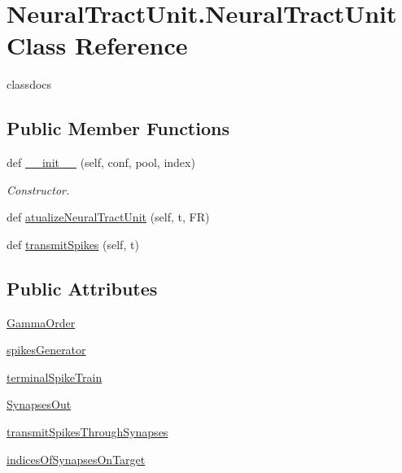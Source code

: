 \hypertarget{class_neural_tract_unit_1_1_neural_tract_unit}{}\section{Neural\+Tract\+Unit.\+Neural\+Tract\+Unit Class Reference}
\label{class_neural_tract_unit_1_1_neural_tract_unit}


classdocs  


\subsection*{Public Member Functions}
\begin{DoxyCompactItemize}
\item 
def \hyperlink{class_neural_tract_unit_1_1_neural_tract_unit_acd96f13aa788dc9699fed515783b6543}{\+\_\+\+\_\+init\+\_\+\+\_\+} (self, conf, pool, index)
\begin{DoxyCompactList}\small\item\em Constructor. \end{DoxyCompactList}\item 
def \hyperlink{class_neural_tract_unit_1_1_neural_tract_unit_a30ea40e013697346cae35a342640a6e4}{atualize\+Neural\+Tract\+Unit} (self, t, FR)
\item 
def \hyperlink{class_neural_tract_unit_1_1_neural_tract_unit_a6244f11e9aae2d31066e020f9421a9d8}{transmit\+Spikes} (self, t)
\end{DoxyCompactItemize}
\subsection*{Public Attributes}
\begin{DoxyCompactItemize}
\item 
\hyperlink{class_neural_tract_unit_1_1_neural_tract_unit_aee01a134ce97127783d75757ec15f352}{Gamma\+Order}
\item 
\hyperlink{class_neural_tract_unit_1_1_neural_tract_unit_a57cbb130e004fb3f7ee8d8a540f7dff0}{spikes\+Generator}
\item 
\hyperlink{class_neural_tract_unit_1_1_neural_tract_unit_ac34c86235329e753e8cfdfcc1e24c53f}{terminal\+Spike\+Train}
\item 
\hyperlink{class_neural_tract_unit_1_1_neural_tract_unit_a740d2cfa17ad57c7dbd40fbafc654b95}{Synapses\+Out}
\item 
\hyperlink{class_neural_tract_unit_1_1_neural_tract_unit_ac6fa367f6ada8045919674feaed4f6ad}{transmit\+Spikes\+Through\+Synapses}
\item 
\hyperlink{class_neural_tract_unit_1_1_neural_tract_unit_a4e5fa20e16e924e7f27a087e8f7a19a7}{indices\+Of\+Synapses\+On\+Target}
\end{DoxyCompactItemize}


